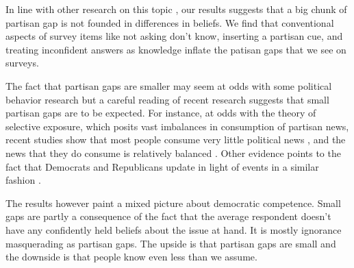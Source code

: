 \documentclass[12pt, letterpaper]{article}
\begin{document}
	In line with other research on this topic \citep[][though see \citeauthor{berinsky_2017} \citeyear{berinsky_2017} and \citeauthor{peterson_iyengar_forth} \citeyear{peterson_iyengar_forth}]{bullocketal_2015, prior2015you, schaffner_luks}, our results suggests that a big chunk of partisan gap is not founded in differences in beliefs. We find that conventional aspects of survey items like not asking don't know, inserting a partisan cue, and treating inconfident answers as knowledge inflate the patisan gaps that we see on surveys.
	
	The fact that partisan gaps are smaller may seem at odds with some political behavior research but a careful reading of recent research suggests that small partisan gaps are to be expected. For instance, at odds with the theory of selective exposure, which posits vast imbalances in consumption of partisan news, recent studies show that most people consume very little political news \citep{Prior2007,flaxmanetal_2016}, and the news that they do consume is relatively balanced \citep{flaxmanetal_2016,garzetal_2018,gentzkowshapiro_2011,guess_2020}. Other evidence points to the fact that Democrats and Republicans update in light of events in a similar fashion \citep{gerber_annual_review,kernell_2019}.
	
	The results however paint a mixed picture about democratic competence. Small gaps are partly a consequence of the fact that the average respondent doesn't have any confidently held beliefs about the issue at hand. It is mostly ignorance masquerading as partisan gaps. The upside is that partisan gaps are small and the downside is that people know even less than we assume.
	
	\clearpage
	
	
	
	\clearpage
	
	
	
	
\end{document}
